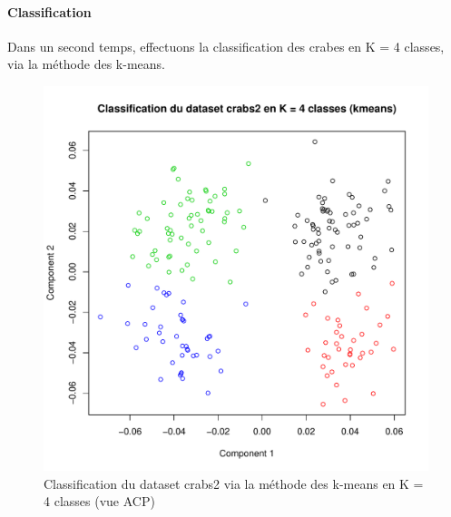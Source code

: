 \documentclass{report}
\begin{document}
\paragraph{Classification}
Dans un second temps, effectuons la classification des crabes en K = 4 classes, via la méthode des k-means.
\begin{figure}[ht!]
\begin{center}
    \includegraphics[width=\textwidth]{../plots/E3Q6_2.pdf}
    \caption{Classification du dataset crabs2 via la méthode des k-means en K = 4 classes (vue ACP)}
\end{center}
\end{figure}
\newpage
\end{document}
